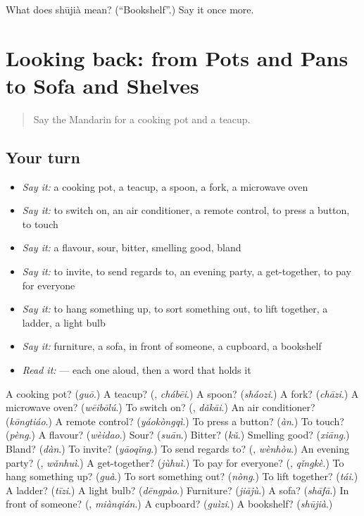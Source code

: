 \begin{tcolorbox}[breakable,colback=teal!4,colframe=teal!35!black,title={Before you move on}]
What does shūjià mean? (\textquotedblleft{}Bookshelf\textquotedblright{}.) Say it once more.
\end{tcolorbox}
\section[(dialogue)]{Looking back: from Pots and Pans to Sofa and Shelves}

\label{lesson:ZH-R175-review-170-175}



\begin{quote}
Say the Mandarin for a cooking pot and a teacup.
\end{quote}

\subsection*{Your turn}
\begin{itemize}
\raggedright
  \item \emph{Say it:} a cooking pot, a teacup, a spoon, a fork, a microwave oven
  \item \emph{Say it:} to switch on, an air conditioner, a remote control, to press a button, to touch
  \item \emph{Say it:} a flavour, sour, bitter, smelling good, bland
  \item \emph{Say it:} to invite, to send regards to, an evening party, a get-together, to pay for everyone
  \item \emph{Say it:} to hang something up, to sort something out, to lift together, a ladder, a light bulb
  \item \emph{Say it:} furniture, a sofa, in front of someone, a cupboard, a bookshelf
  \item \emph{Read it:}    — each one aloud, then a word that holds it
\end{itemize}

\begin{tcolorbox}[breakable,colback=teal!4,colframe=teal!35!black,title={Before you move on}]
A cooking pot? (\emph{guō}.) A teacup? (\textbf{}, \emph{chábēi}.) A spoon? (\emph{sháozi}.) A fork? (\emph{chāzi}.) A microwave oven? (\emph{wēibōlú}.) To switch on? (\textbf{}, \emph{dǎkāi}.) An air conditioner? (\emph{kōngtiáo}.) A remote control? (\emph{yáokòngqì}.) To press a button? (\emph{àn}.) To touch? (\emph{pèng}.) A flavour? (\emph{wèidao}.) Sour? (\emph{suān}.) Bitter? (\emph{kǔ}.) Smelling good? (\emph{xiāng}.) Bland? (\emph{dàn}.) To invite? (\emph{yāoqǐng}.) To send regards to? (\textbf{}, \emph{wènhòu}.) An evening party? (\textbf{}, \emph{wǎnhuì}.) A get-together? (\emph{jùhuì}.) To pay for everyone? (\textbf{}, \emph{qǐngkè}.) To hang something up? (\emph{guà}.) To sort something out? (\emph{nòng}.) To lift together? (\emph{tái}.) A ladder? (\emph{tīzi}.) A light bulb? (\emph{dēngpào}.) Furniture? (\emph{jiājù}.) A sofa? (\emph{shāfā}.) In front of someone? (\textbf{}, \emph{miànqián}.) A cupboard? (\emph{guìzi}.) A bookshelf? (\emph{shūjià}.)
\end{tcolorbox}
